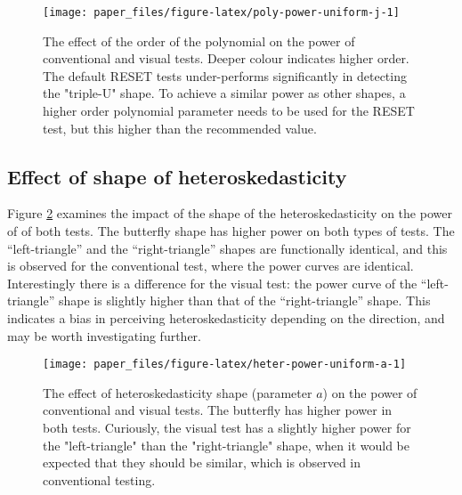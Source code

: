 \documentclass[]{interact}
\theoremstyle{plain}%
\theoremstyle{definition}
\theoremstyle{remark}
\begin{document}
\begin{figure}

{\centering \texttt{[image: paper\_files/figure-latex/poly-power-uniform-j-1]} 

}

\caption{The effect of the order of the polynomial on the power of conventional and visual tests. Deeper colour indicates higher order. The default RESET tests under-performs significantly in detecting the "triple-U" shape. To achieve a similar power as other shapes, a higher order polynomial parameter needs to be used for the RESET test, but this higher than the recommended value.}\label{fig:poly-power-uniform-j}
\end{figure}

\hypertarget{effect-of-shape-of-heteroskedasticity}{%
\subsection{\texorpdfstring{Effect of shape of
heteroskedasticity\label{hetero-analysis}}{Effect of shape of heteroskedasticity}}\label{effect-of-shape-of-heteroskedasticity}}

Figure \ref{fig:heter-power-uniform-a} examines the impact of the shape
of the heteroskedasticity on the power of of both tests. The butterfly
shape has higher power on both types of tests. The ``left-triangle'' and
the ``right-triangle'' shapes are functionally identical, and this is
observed for the conventional test, where the power curves are
identical. Interestingly there is a difference for the visual test: the
power curve of the ``left-triangle'' shape is slightly higher than that
of the ``right-triangle'' shape. This indicates a bias in perceiving
heteroskedasticity depending on the direction, and may be worth
investigating further.

\begin{figure}

{\centering \texttt{[image: paper\_files/figure-latex/heter-power-uniform-a-1]} 

}

\caption{The effect of heteroskedasticity shape (parameter $a$) on the power of conventional and visual tests. The butterfly has higher power in both tests. Curiously, the visual test has a slightly higher power for the "left-triangle" than the "right-triangle" shape, when it would be expected that they should be similar, which is observed in conventional testing.}\label{fig:heter-power-uniform-a}
\end{figure}
\end{document}
